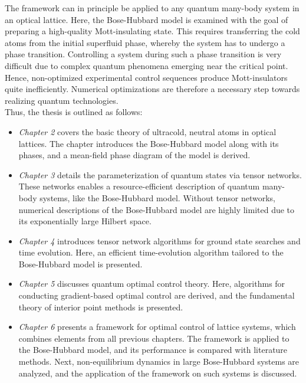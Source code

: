 The framework can in principle be applied to any quantum many-body system in an optical lattice. Here, the Bose-Hubbard model is examined with the goal of preparing a high-quality Mott-insulating state. This requires transferring the cold atoms from the initial superfluid phase, whereby the system has to undergo a phase transition. Controlling a system during such a phase transition is very difficult due to complex quantum phenomena emerging near the critical point. Hence, non-optimized experimental control sequences produce Mott-insulators quite inefficiently. Numerical optimizations are therefore a necessary step towards realizing quantum technologies.\\
Thus, the thesis is outlined as follows:
\begin{itemize}
\item[]
\textit{Chapter 2} covers the basic theory of ultracold, neutral atoms in optical lattices. The chapter introduces the Bose-Hubbard model along with its phases, and a mean-field phase diagram of the model is derived.

\item[]
\textit{Chapter 3} details the parameterization of quantum states via tensor networks. These networks enables a resource-efficient description of quantum many-body systems, like the Bose-Hubbard model. Without tensor networks, numerical descriptions of the Bose-Hubbard model are highly limited due to its exponentially large Hilbert space.

\item[]
\textit{Chapter 4} introduces tensor network algorithms for ground state searches and time evolution. Here, an efficient time-evolution algorithm tailored to the Bose-Hubbard model is presented.

\item[]
\textit{Chapter 5} discusses quantum optimal control theory. Here, algorithms for conducting gradient-based optimal control are derived, and the fundamental theory of interior point methods is presented.

\item[]
\textit{Chapter 6} presents a framework for optimal control of lattice systems, which combines elements from all previous chapters. The framework is applied to the Bose-Hubbard model, and its performance is compared with literature methods. Next, non-equilibrium dynamics in large Bose-Hubbard systems are analyzed, and the application of the framework on such systems is discussed.     
\end{itemize}
